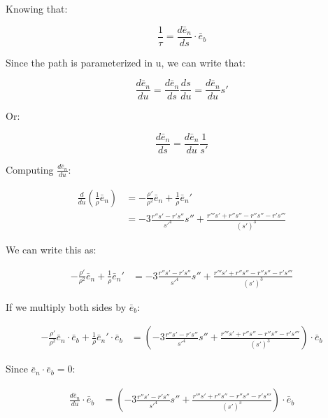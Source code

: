 \documentclass[12pt, letterpaper]{../assignment}
\begin{document}
Knowing that:

$$ \frac{1}{\tau} = \frac{d \bar{e}_n}{d s} \cdot \bar{e}_b $$

Since the path is parameterized in u, we can write that:

$$ \frac{d \bar{e}_n}{d u} = \frac{d \bar{e}_n}{d s}\frac{d s}{d u} = 
\frac{d \bar{e}_n}{d u} s'$$

Or:

$$ \frac{d \bar{e}_n}{d s} = \frac{d \bar{e}_n}{d u} \frac{1}{s'} $$

Computing $\frac{d \bar{e}_n}{d u}$:

\begin{equation*}
\begin{aligned}
\frac{d }{d u}\left(\frac{1}{\rho}\bar{e}_n\right)
&= -\frac{\rho'}{\rho^2} \bar{e}_n + \frac{1}{\rho}\bar{e}_n'\\
&= -3\frac{r'' s' - r's''}{{s'}^4}{s''}
+ \frac{r''' s' + r''s'' - r''s'' - r's'''}{(s')^3}
\end{aligned}
\end{equation*}

We can write this as:

\begin{equation*}
    \begin{aligned}
    -\frac{\rho'}{\rho^2} \bar{e}_n + \frac{1}{\rho}\bar{e}_n'
    &= -3\frac{r'' s' - r's''}{{s'}^4}{s''}
    + \frac{r''' s' + r''s'' - r''s'' - r's'''}{(s')^3}
    \end{aligned}
\end{equation*}

If we multiply both sides by $\bar{e}_b$:

\begin{equation*}
    \begin{aligned}
    -\frac{\rho'}{\rho^2} \bar{e}_n \cdot \bar{e}_b + \frac{1}{\rho}\bar{e}_n' \cdot \bar{e}_b
    &= \left(-3\frac{r'' s' - r's''}{{s'}^4}{s''}
    + \frac{r''' s' + r''s'' - r''s'' - r's'''}{(s')^3}\right) \cdot \bar{e}_b
    \end{aligned}
\end{equation*}

Since $\bar{e}_n \cdot \bar{e}_b = 0$:

\begin{equation*}
    \begin{aligned}
        \frac{d \bar{e}_n}{d u} \cdot \bar{e}_b
    &= \left(-3\frac{r'' s' - r's''}{{s'}^4}{s''}
    + \frac{r''' s' + r''s'' - r''s'' - r's'''}{(s')^3}\right) \cdot \bar{e}_b
    \end{aligned}
\end{equation*}
\end{document}
